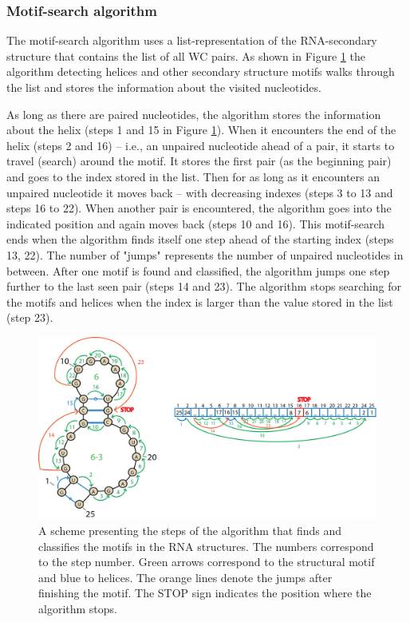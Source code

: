 \documentclass[12pt]{article}
\begin{document}
\subsubsection{Motif-search algorithm}
The motif-search algorithm uses a list-representation of the RNA-secondary structure that contains the list of all WC pairs. As shown in Figure \ref{MotifsAlgorithm} the algorithm detecting helices and other secondary structure motifs walks through the list and stores the information about the visited nucleotides. 

As long as there are paired nucleotides, the algorithm stores the information about the helix (steps 1 and 15 in Figure \ref{MotifsAlgorithm}). When it encounters the end of the helix (steps 2 and 16) -- i.e., an unpaired nucleotide ahead of a pair, it starts to travel (search) around the motif. It stores the first pair (as the beginning pair) and goes to the index stored in the list. Then for as long as it encounters an unpaired nucleotide it moves back -- with decreasing indexes (steps 3 to 13 and steps 16 to 22). When another pair is encountered, the algorithm goes into the indicated position and again moves back (steps 10 and 16). This motif-search ends when the algorithm finds itself one step ahead of the starting index (steps 13, 22). The number of "jumps" represents the number of unpaired nucleotides in between. After one motif is found and classified, the algorithm jumps one step further to the last seen pair (steps 14 and 23). The algorithm stops searching for the motifs and helices when the index is larger than the value stored in the list (step 23). 

\begin{figure}[h!]
\centering
\includegraphics[width =\textwidth]{./pictures/algorithm.png}
\caption{A scheme presenting the steps of the algorithm that finds and classifies the motifs in the RNA structures. The numbers correspond to the step number. Green arrows correspond to the structural motif and blue to  helices. The orange lines denote the jumps after finishing the motif. The STOP sign indicates the position where the algorithm stops.}
\label{MotifsAlgorithm}
\end{figure}
\end{document}
